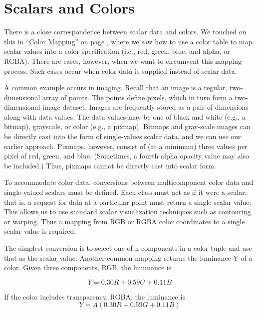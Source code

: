 \section{Scalars and Colors}

There is a close correspondence between scalar data and colors. We touched on this in ``Color Mapping'' on page \pageref{subsec:color_mapping}, where we saw how to use a color table to map scalar values into a color specification (i.e., red, green, blue, and alpha, or RGBA). There are cases, however, when we want to circumvent this mapping process. Such cases occur when color data is supplied instead of scalar data.

A common example occurs in imaging. Recall that an image is a regular, two-dimensional array of points. The points define pixels, which in turn form a two-dimensional image dataset. Images are frequently stored as a pair of dimensions along with data values. The data values may be one of black and white (e.g., a bitmap), grayscale, or color (e.g., a pixmap). Bitmaps and gray-scale images can be directly cast into the form of single-values scalar data, and we can use our earlier approach. Pixmaps, however, consist of (at a minimum) three values per pixel of red, green, and blue. (Sometimes, a fourth alpha opacity value may also be included.) Thus, pixmaps cannot be directly cast into scalar form.

To accommodate color data, conversions between multicomponent color data and single-valued scalars must be defined. Each class must act as if it were a scalar: that is, a request for data at a particular point must return a single scalar value. This allows us to use standard scalar visualization techniques such as contouring or warping. Thus a mapping from RGB or RGBA color coordinates to a single scalar value is required.

The simplest conversion is to select one of n components in a color tuple and use that as the scalar value. Another common mapping returns the luminance Y of a color. Given three components, RGB, the luminance is

\begin{equation}\label{eq:8.26}
Y = 0.30 R + 0.59 G + 0.11 B\end{equation}

If the color includes transparency, RGBA, the luminance is
\begin{equation}\label{eq:8.27}
Y = A(0.30 R + 0.59 G + 0.11 B)
\end{equation}

